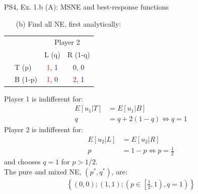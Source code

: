 \begin{frame}{PS4, Ex. 1.b (A): MSNE and best-response functions}
  \begin{multicols}{2}
    \begin{itemize}
      \item[(b)] Find all NE, first analytically:
    \end{itemize}
    \begin{table}
      \begin{tabular}{cl|c|c|}
        & \multicolumn{1}{c}{} & \multicolumn{2}{c}{\color{blue}Player 2}\\
        \parbox[t]{1mm}{}
        &  &  &  \\
        & T (p) & \textcolor{red}{1}, \textcolor{blue}{1} & 0, 0 \\
        & B (1-p) & \textcolor{red}{1}, 0 & \textcolor{red}{2}, \textcolor{blue}{1} \\
      \end{tabular}
    \end{table}
    Player 1 is indifferent for:
    \begin{align*}
      E[u_1|T]&=E[u_1|B]\\
      q &= q + 2(1-q) \Leftrightarrow q = 1
    \end{align*}
    Player 2 is indifferent for:
    \begin{align*}
      E[u_2|L]&=E[u_2|R]\\
      p &= 1-p \Leftrightarrow p = \frac{1}{2}
    \end{align*}
    and chooses $q=1$ for $p>1/2$.\\\medskip
    The pure and mixed NE, $(p^{*},q^{*})$, are:
    \begin{align*}
      \left\{(0,0);(1,1);\left(p\in\left[\frac{1}{2},1\right),q=1\right)\right\}
    \end{align*}
  \vfill\null \columnbreak
  \vfill\null
  \end{multicols}
\end{frame}

